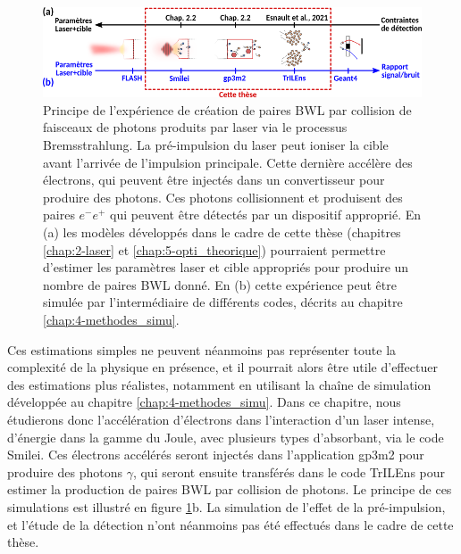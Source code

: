 \begin{refsection}
\begin{figure}[hbtp]
	\centering
	\includegraphics[width=\linewidth]{6-opti_numerique/theoretical_numerical_optimization.png}
	\caption{Principe de l'expérience de création de paires BWL par collision de faisceaux de photons produits par laser via le processus Bremsstrahlung. La pré-impulsion du laser peut ioniser la cible avant l'arrivée de l'impulsion principale. Cette dernière accélère des électrons, qui peuvent être injectés dans un convertisseur pour produire des photons. Ces photons collisionnent et produisent des paires $e^-e^+$ qui peuvent être détectés par un dispositif approprié. En (a) les modèles développés dans le cadre de cette thèse (chapitres \ref{chap:2-laser} et \ref{chap:5-opti_theorique}) pourraient permettre d'estimer les paramètres laser et cible appropriés pour produire un nombre de paires BWL donné. En (b) cette expérience peut être simulée par l'intermédiaire de différents codes, décrits au chapitre \ref{chap:4-methodes_simu}.}
	\label{fig:61-principe_theorie_simu}
\end{figure}

Ces estimations simples ne peuvent néanmoins pas représenter toute la complexité de la physique en présence, et il pourrait alors être utile d'effectuer des estimations plus réalistes, notamment en utilisant la chaîne de simulation développée au chapitre \ref{chap:4-methodes_simu}. 
Dans ce chapitre, nous étudierons donc l'accélération d'électrons dans l'interaction d'un laser intense, d'énergie dans la gamme du Joule, avec plusieurs types d'absorbant, via le code Smilei. Ces électrons accélérés seront injectés dans l'application gp3m2 pour produire des photons $\gamma$, qui seront ensuite transférés dans le code TrILEns pour estimer la production de paires BWL par collision de photons. Le principe de ces simulations est illustré en figure \ref{fig:61-principe_theorie_simu}b. La simulation de l'effet de la pré-impulsion, et l'étude de la détection n'ont néanmoins pas été effectués dans le cadre de cette thèse.



\end{refsection}
